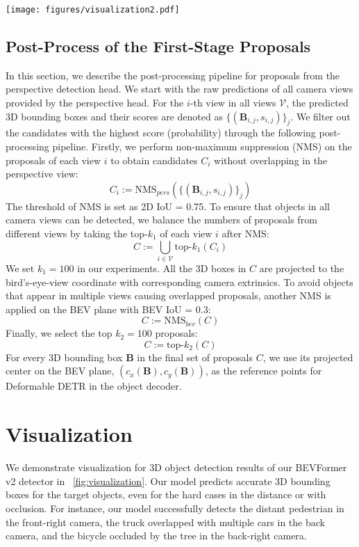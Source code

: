 \documentclass[10pt,twocolumn,letterpaper]{article}
\begin{document}
\begin{figure*}[t]
    \centering
    \texttt{[image: figures/visualization2.pdf]}
    \caption{Visualization of BEVFormer v2 3D object detection predictions.}
    \label{fig:visualization}
\end{figure*}

\subsection{Post-Process of the First-Stage Proposals}
In this section, we describe the post-processing pipeline for proposals from the perspective detection head. 
We start with the raw predictions of all camera views provided by the perspective head. 
For the $i$-th view in all views $\mathcal{V}$, the predicted 3D bounding boxes and their scores are denoted as $\{(\mathbf{B}_{i,j},s_{i,j})\}_j$.
We filter out the candidates with the highest score (probability) through the following post-processing pipeline. 
Firstly, we perform non-maximum suppression (NMS) on the proposals of each view $i$ to obtain candidates $C_i$ without overlapping in the perspective view:
\begin{equation}
    C_i := \text{NMS}_{pers}\left(\{(\mathbf{B}_{i,j},s_{i,j})\}_j\right)
\end{equation}
The threshold of NMS is set as 2D IoU = 0.75. To ensure that objects in all camera views can be detected, we balance the numbers of proposals from different views by taking the top-$k_1$ of each view $i$ after NMS:
\begin{equation}
    C := \bigcup_{i\in\mathcal{V}} \text{top-}k_1\left(C_i\right)
\end{equation}
We set $k_1=100$ in our experiments. 
All the 3D boxes in $C$ are projected to the bird's-eye-view coordinate with corresponding camera extrinsics. 
To avoid objects that appear in multiple views causing overlapped proposals, another NMS is applied on the BEV plane with BEV IoU = 0.3: 
\begin{equation}
    C := \text{NMS}_{bev}(C)
\end{equation}
Finally, we select the top $k_2=100$ proposals: 
\begin{equation}
    C := \text{top-}k_2(C)
\end{equation}
For every 3D bounding box $\mathbf{B}$ in the final set of proposals $C$, we use its projected center on the BEV plane, $(c_x(\mathbf{B}),c_y(\mathbf{B}))$, as the reference points for Deformable DETR in the object decoder. 


\section{Visualization}
We demonstrate visualization for 3D object detection results of our BEVFormer v2 detector in ~\cref{fig:visualization}. Our model predicts accurate 3D bounding boxes for the target objects, even for the hard cases in the distance or with occlusion. For instance, our model successfully detects the distant pedestrian in the front-right camera, the truck overlapped with multiple cars in the back camera, and the bicycle occluded by the tree in the back-right camera.



%
 
\end{document}
